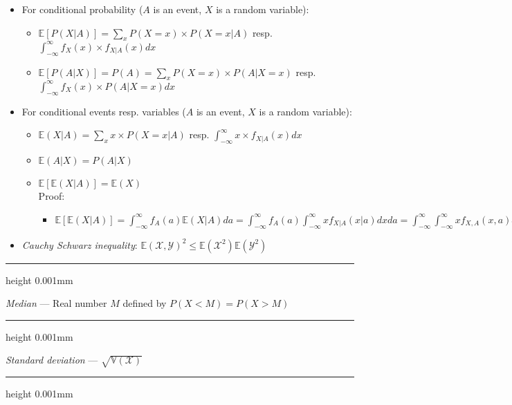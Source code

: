 \begin{itemize}
    \item For conditional probability ($A$ is an event, $X$ is a random variable): \\
    \begin{itemize}
        \item $\mathbb{E}[P(X | A)] = \sum_x P(X=x) \times P(X=x | A) $ resp. $\int_{-\infty}^{\infty} f_X(x) \times f_{X|A}(x)dx$ 
        \item $\mathbb{E}[P(A | X)] = P(A) = \sum_x P(X=x) \times P(A | X=x) $ resp. $\int_{-\infty}^{\infty} f_X(x) \times P(A|X=x) dx$ 
    \end{itemize}
    \item For conditional events resp. variables ($A$ is an event, $X$ is a random variable): \\
    \begin{itemize}
        \item $\mathbb{E}(X | A) = \sum_x x \times P(X=x | A) $ resp. $\int_{-\infty}^{\infty} x \times f_{X|A}(x)dx$ 
        \item $\mathbb{E}(A | X) = P(A|X)$
        \item $\mathbb{E}[\mathbb{E}(X | A)] = \mathbb{E}(X)$\\
        Proof:
        \begin{itemize}
            \item $\mathbb{E}[\mathbb{E}(X | A)] = \int_{-\infty}^{\infty} f_A(a) \mathbb{E}(X | A) da = \int_{-\infty}^{\infty} f_A(a) \int_{-\infty}^{\infty} x f_{X|A}(x|a) dx da = \int_{-\infty}^{\infty} \int_{-\infty}^{\infty} x f_{X,A}(x,a) dx da = \int_{-\infty}^{\infty} x \int_{-\infty}^{\infty} f_{X,A}(x,a) da dx = \int_{-\infty}^{\infty} x f_{X}(x) dx = \mathbb{E}(X)$
        \end{itemize}
    \end{itemize}
    \item \emph{Cauchy Schwarz inequality}: $\mathbb{E}(\mathcal{X},\mathcal{Y})^2 \leq \mathbb{E}(\mathcal{X}^2)\mathbb{E}(\mathcal{Y}^2)$
\end{itemize}

{\color{lightgray}\hrule height 0.001mm}

\emph{Median} --- Real number $M$ defined by $P(X<M) = P(X>M)$

{\color{lightgray}\hrule height 0.001mm}

\emph{Standard deviation} --- $\sqrt{\mathbb{V}(\mathcal{X})}$

{\color{lightgray}\hrule height 0.001mm}

